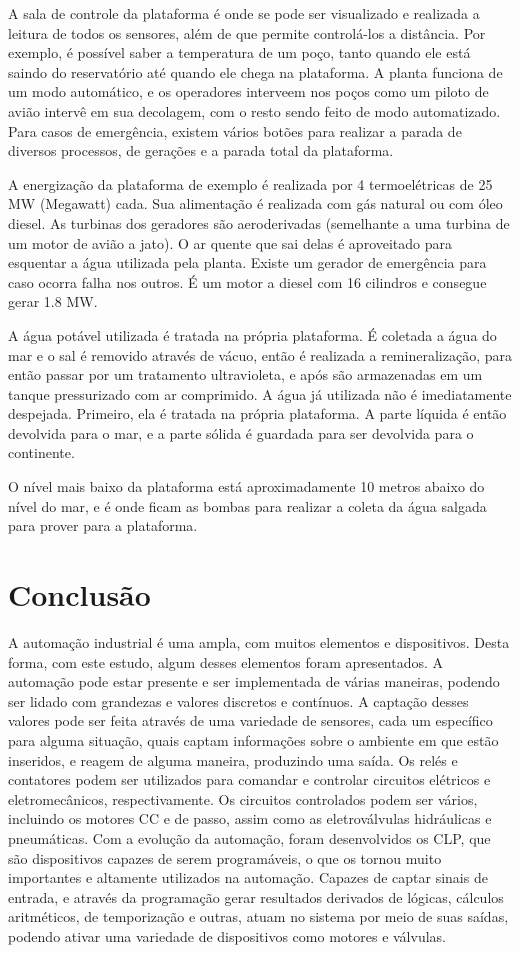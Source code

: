 \documentclass{article}
\begin{document}
A sala de controle da plataforma é onde se pode ser visualizado e realizada a leitura de todos os sensores, além de que permite controlá-los a distância. Por exemplo, é possível saber a temperatura de um poço, tanto quando ele está saindo do reservatório até quando ele chega na plataforma. A planta funciona de um modo automático, e os operadores interveem nos poços como um piloto de avião intervê em sua decolagem, com o resto sendo feito de modo automatizado. Para casos de emergência, existem vários botões para realizar a parada de diversos processos, de gerações e a parada total da plataforma. 

A energização da plataforma de exemplo é realizada por 4 termoelétricas de 25 MW (Megawatt) cada. Sua alimentação é realizada com gás natural ou com óleo diesel. As turbinas dos geradores são aeroderivadas (semelhante a uma turbina de um motor de avião a jato). O ar quente que sai delas é aproveitado para esquentar a água utilizada pela planta. Existe um gerador de emergência para caso ocorra falha nos outros. É um motor a diesel com 16 cilindros e consegue gerar 1.8 MW. 

A água potável utilizada é tratada na própria plataforma. É coletada a água do mar e o sal é removido através de vácuo, então é realizada a remineralização, para então passar por um tratamento ultravioleta, e após são armazenadas em um tanque pressurizado com ar comprimido. A água já utilizada não é imediatamente despejada. Primeiro, ela é tratada na própria plataforma. A parte líquida é então devolvida para o mar, e a parte sólida é guardada para ser devolvida para o continente.  

O nível mais baixo da plataforma	 está aproximadamente 10 metros abaixo do nível do mar, e é onde ficam as bombas para realizar a coleta da água salgada para prover para a plataforma.

\section{Conclusão}

A automação industrial é uma ampla, com muitos elementos e dispositivos. Desta forma, com este estudo, algum desses elementos foram apresentados. A automação pode estar presente e ser implementada de várias maneiras, podendo ser lidado com grandezas e valores discretos e contínuos. A captação desses valores pode ser feita através de uma variedade de sensores, cada um específico para alguma situação, quais captam informações sobre o ambiente em que estão inseridos, e reagem de alguma maneira, produzindo uma saída. Os relés e contatores podem ser utilizados para comandar e controlar circuitos elétricos e eletromecânicos, respectivamente. Os circuitos controlados podem ser vários, incluindo os motores CC e de passo, assim como as eletroválvulas hidráulicas e pneumáticas. Com a evolução da automação, foram desenvolvidos os CLP, que são dispositivos capazes de serem programáveis, o que os tornou muito importantes e altamente utilizados na automação. Capazes de captar sinais de entrada, e através da programação gerar resultados derivados de lógicas, cálculos aritméticos, de temporização e outras, atuam no sistema por meio de suas saídas, podendo ativar uma variedade de dispositivos como motores e válvulas.
\end{document}
